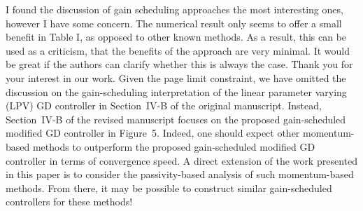 \begin{rebuttal}[pending]
    {%
        I found the discussion of gain scheduling approaches the most interesting ones, however I have some concern. The numerical result only seems to offer a small benefit in Table I, as opposed to other known methods. As a result, this can be used as a criticism, that the benefits of the approach are very minimal. It would be great if the authors can clarify whether this is always the case.
    }%
    {%
        Thank you for your interest in our work. Given the page limit constraint, we have omitted the discussion on the gain-scheduling interpretation of the linear parameter varying (LPV) GD controller in \mbox{Section~IV-B} of the original manuscript. Instead, Section~IV-B of the revised manuscript focuses on the proposed gain-scheduled modified GD controller in Figure~5. Indeed, one should expect other momentum-based methods to outperform the proposed gain-scheduled modified GD controller in terms of convergence speed. A direct extension of the work presented in this paper is to consider the passivity-based analysis of such momentum-based methods. From there, it may be possible to construct similar gain-scheduled controllers for these methods!
    }%
\end{rebuttal}
